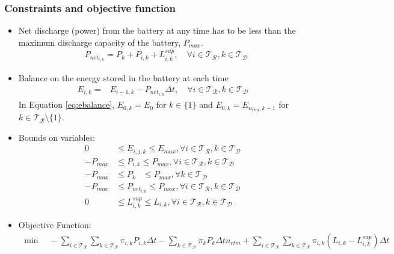 \documentclass[11pt,twoside]{article}
\begin{document}
\subsubsection{Constraints and objective function}\label{subsec:const_obj}
\begin{itemize}
\item Net discharge (power) from the battery at any time has to be less than the maximum discharge capacity of the battery, $P_{max}$.
\begin{align}\label{eq:Pnet}
&P_{{net}_{i,k}} = P_{k} + P_{i,k} + L^{sup}_{i,k}, \quad \forall i \in \mathcal{T_R}, k \in \mathcal{T_D}
\end{align}
\item Balance on the energy stored in the battery at each time
\begin{align}\label{eq:ebalance}
E_{i,k} =& E_{i-1,k}- P_{{net}_{i,k}}\Delta t, \quad \forall i \in \mathcal{T_R}, k \in \mathcal{T_D}
\end{align}
In Equation \eqref{eq:ebalance}, $E_{0,k} = E_{0}$ for $k \in \lbrace1\rbrace$ and $E_{0,k} = E_{n_{rtm},k-1}$ for $k \in \mathcal{T_R}\setminus{\lbrace1\rbrace}$. 
\item Bounds on variables:
\begin{subequations}\label{eq:bounds}
\begin{align}
0 & \leq E_{i,j,k} \leq E_{max}, \forall i \in \mathcal{T_R}, k \in \mathcal{T_D}\\
-P_{max} & \leq P_{i,k} \leq P_{max}, \forall i \in \mathcal{T_R}, k \in \mathcal{T_D}\\
-P_{max} & \leq P_{k}\phantom{i,} \leq P_{max}, \forall k \in \mathcal{T_D}\\
-P_{max} & \leq P_{{net}_{i,k}} \leq P_{max}, \forall i \in \mathcal{T_R}, k \in \mathcal{T_D}\\
0 & \leq L^{sup}_{i,k} \leq L_{i,k}, \forall i \in \mathcal{T_R}, k \in \mathcal{T_D}
\end{align}
\end{subequations}
\item Objective Function:
\begin{align}\label{objective}
\min \quad -\sum\limits_{i \in \mathcal{T_R}}\sum\limits_{k \in \mathcal{T_R}} \pi_{i,k}P_{i,k}\Delta t - \sum\limits_{k \in \mathcal{T_D}}\pi_{k}P_{k}\Delta t n_{rtm} + \sum\limits_{i \in \mathcal{T_R}}\sum\limits_{k \in \mathcal{T_R}} \pi_{i,k}(L_{i,k}-L^{sup}_{i,k})\Delta t
\end{align}
\end{itemize}
\end{document}
